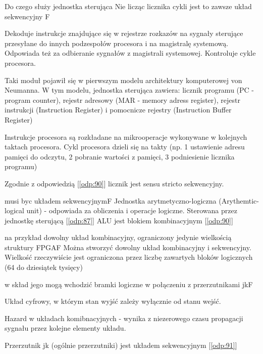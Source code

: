 \answer
{Do czego służy jednostka sterująca}
{Nie licząc licznika cykli jest to zawsze układ sekwencyjny}
{F}
{
\cite{js} Dekoduje instrukcje znajdujące się w rejestrze rozkazów na sygnały sterujące przesyłane do innych podzespołów procesora i na magistralę systemową. Odpowiada też za odbieranie sygnałów z magistrali systemowej. Kontroluje cykle procesora.

\cite{uw} Taki moduł pojawił się w pierwszym modelu architektury komputerowej von Neumanna. W tym modelu, jednostka sterująca zawiera: licznik programu (PC - program counter), rejestr adresowy (MAR - memory adress register), rejestr instrukcji (Instruction Register) i pomocnicze rejestry (Instruction Buffer Register)

\cite{js} Instrukcje procesora są rozkładane na mikrooperacje wykonywane w kolejnych taktach procesora. Cykl procesora dzieli się na takty (np. 1 ustawienie adresu pamięci do odczytu, 2 pobranie wartości z pamięci, 3 podniesienie licznika programu)
}
{Zgodnie z odpowiedzią [\ref{odp:90}] licznik jest sensu stricto sekwencyjny.}
\label{odp:87}

{musi byc układem sekwencyjnym}{F}
{
Jednostka arytmetyczno-logiczna (Arythemtic-logical unit) - odpowiada za obliczenia i operacje logiczne. Sterowana przez jednostkę sterującą [\ref{odp:87}]
}
{\cite{uk} ALU jest blokiem kombinacyjnym [\ref{odp:90}]}

{na przykład dowolny układ kombinacyjny, ograniczony jedynie wielkością struktury FPGA}{F}
{Można stworzyć dowolny układ kombinacyjny i sekwencyjny. Wielkość rzeczywiście jest ograniczona przez liczbę zawartych bloków logicznych (64 do dziesiątek tysięcy)}
{}

{w skład jego mogą wchodzić bramki logiczne w połączeniu z przerzutnikami jk}{F}
{
Układ cyfrowy, w którym stan wyjść zależy wyłącznie od stanu wejść.

Hazard w układach komibnacyjnych - wynika z niezerowego czasu propagacji sygnału przez kolejne elementy układu.
}
{Przerzutnik jk (ogólnie przerzutniki) jest układem sekwencyjnym [\ref{odp:91}]}
\label{odp:90}

